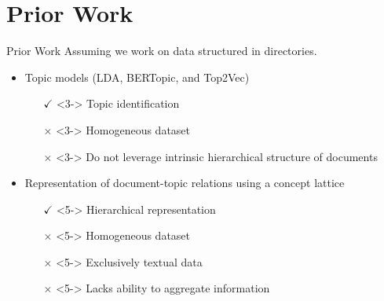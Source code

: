 \section{Prior Work}
    \begin{frame}{Prior Work}
    Assuming we work on data structured in directories.
    \begin{itemize}
        \item<2-> Topic models (LDA, BERTopic, and Top2Vec)
        \begin{itemize}
            \item[$\checkmark$]<3-> Topic identification
            \item[$\times$]<3-> Homogeneous dataset
            \item[$\times$]<3-> Do not leverage intrinsic hierarchical structure of documents
        \end{itemize}
        \item<4-> Representation of document-topic relations using a concept lattice~\cite{topic_modeling_2024}
        \begin{itemize}
            \item[$\checkmark$]<5-> Hierarchical representation
            \item[$\times$]<5-> Homogeneous dataset
            \item[$\times$]<5-> Exclusively textual data
            \item[$\times$]<5-> Lacks ability to aggregate information 
        \end{itemize}
    \end{itemize}
\end{frame}
